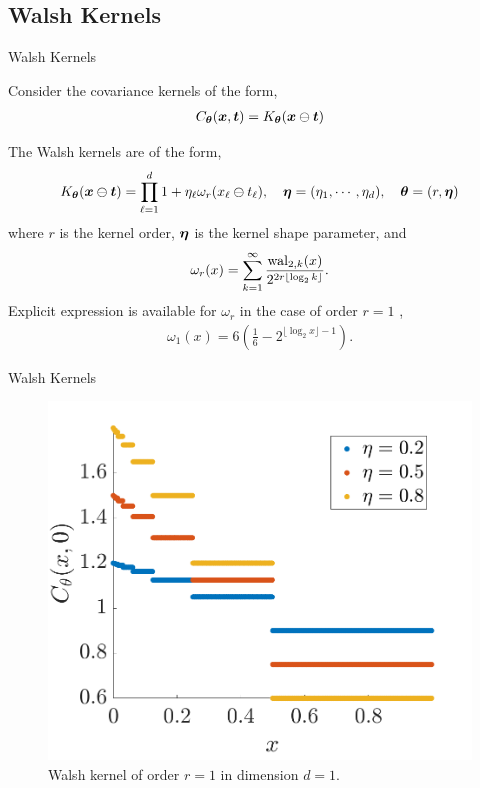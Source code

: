 \documentclass[handout, 10pt,compress,xcolor={usenames,dvipsnames}]{beamer} %
\newcommand{\bm}[1]{\boldsymbol{#1}}
\renewcommand{\vtheta}{{\bm{\theta}}}
\begin{document}
\subsection{Walsh Kernels}

\begin{frame}{Walsh Kernels}

Consider the covariance kernels of the form,
\begin{align}
\label{eqn:digital_shift_in_kernel}
C_{\vtheta}(\vx, \vt) = K_{\vtheta} (\vx \ominus \vt) 
\end{align}

The Walsh kernels are of the form,
\begin{align}
\label{eqn:walsh_kernel}
K_{\vtheta} (\vx \ominus \vt) =  
\prod_{\ell=1}^d  1 + \eta_\ell \omega_{r} (x_\ell \ominus t_\ell), \quad \veta = (\eta_1, \cdots, \eta_d), \quad \vtheta = (r, \veta)
\end{align}
where $r$ is the kernel order, $\boldsymbol{\eta}$ is the kernel shape parameter, and
\begin{align*}
\omega_r(x) = \sum_{k=1}^\infty 
\frac{\textup{wal}_{2,k}(x) }{2^{2r \lfloor \log_2 k \rfloor}}.
\end{align*}
Explicit expression is available for $\omega_{r}$ in the case of order $r=1$ \cite{Nuyens2013}, %
\begin{align}
\label{eqn:omega1}
\omega_1(x) 
= 6\left( \frac 16 - 2^{\lfloor \log_2 x \rfloor -1 }\right).
\end{align}
\end{frame}


\begin{frame}{Walsh Kernels}
	\vspace{-6ex}
\begin{figure}
	\centering
	\includegraphics[width=0.7\linewidth]{"../figures/walsh_kernel dim_1"}
	\caption[Walsh kernel]{Walsh kernel of order $r=1$ in dimension $d=1$. } 
	\label{fig:walshkernel-dim1}
\end{figure}
\end{frame}
\end{document}
